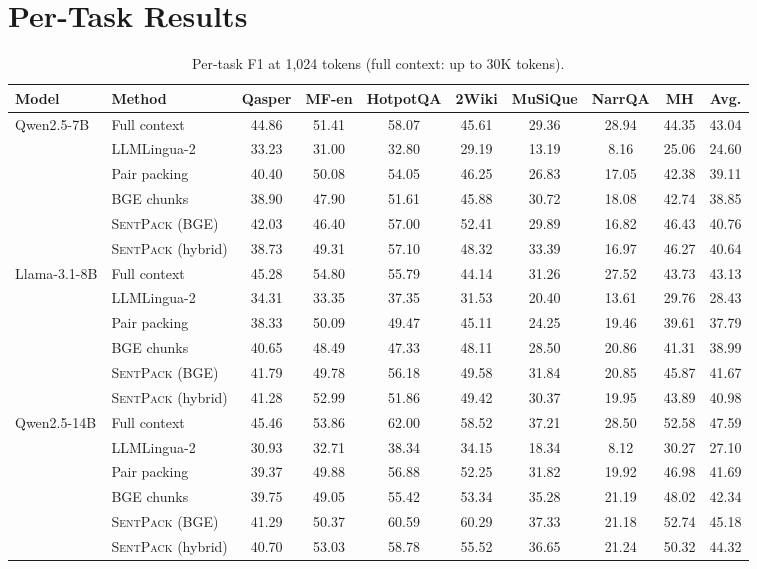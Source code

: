 \documentclass[11pt]{article}
\newcommand{\spk}{\textsc{SentPack}}
\begin{document}
\section{Per-Task Results}
\label{app:pertask}

\begin{table}[t]
\centering
\small
\setlength{\tabcolsep}{4pt}
\begin{tabular}{llcccccc|cc}
\toprule
Model & Method & Qasper & MF-en & HotpotQA & 2Wiki & MuSiQue & NarrQA & MH & Avg. \\
\midrule
\multirow{6}{*}{Qwen2.5-7B}
 & Full context & 44.86 & 51.41 & 58.07 & 45.61 & 29.36 & 28.94 & 44.35 & 43.04 \\
 & LLMLingua-2 & 33.23 & 31.00 & 32.80 & 29.19 & 13.19 & 8.16 & 25.06 & 24.60 \\
 & Pair packing & 40.40 & 50.08 & 54.05 & 46.25 & 26.83 & 17.05 & 42.38 & 39.11 \\
 & BGE chunks & 38.90 & 47.90 & 51.61 & 45.88 & 30.72 & 18.08 & 42.74 & 38.85 \\
 & \spk{} (BGE) & 42.03 & 46.40 & 57.00 & 52.41 & 29.89 & 16.82 & 46.43 & 40.76 \\
 & \spk{} (hybrid) & 38.73 & 49.31 & 57.10 & 48.32 & 33.39 & 16.97 & 46.27 & 40.64 \\
\midrule
\multirow{6}{*}{Llama-3.1-8B}
 & Full context & 45.28 & 54.80 & 55.79 & 44.14 & 31.26 & 27.52 & 43.73 & 43.13 \\
 & LLMLingua-2 & 34.31 & 33.35 & 37.35 & 31.53 & 20.40 & 13.61 & 29.76 & 28.43 \\
 & Pair packing & 38.33 & 50.09 & 49.47 & 45.11 & 24.25 & 19.46 & 39.61 & 37.79 \\
 & BGE chunks & 40.65 & 48.49 & 47.33 & 48.11 & 28.50 & 20.86 & 41.31 & 38.99 \\
 & \spk{} (BGE) & 41.79 & 49.78 & 56.18 & 49.58 & 31.84 & 20.85 & 45.87 & 41.67 \\
 & \spk{} (hybrid) & 41.28 & 52.99 & 51.86 & 49.42 & 30.37 & 19.95 & 43.89 & 40.98 \\
\midrule
\multirow{6}{*}{Qwen2.5-14B}
 & Full context & 45.46 & 53.86 & 62.00 & 58.52 & 37.21 & 28.50 & 52.58 & 47.59 \\
 & LLMLingua-2 & 30.93 & 32.71 & 38.34 & 34.15 & 18.34 & 8.12 & 30.27 & 27.10 \\
 & Pair packing & 39.37 & 49.88 & 56.88 & 52.25 & 31.82 & 19.92 & 46.98 & 41.69 \\
 & BGE chunks & 39.75 & 49.05 & 55.42 & 53.34 & 35.28 & 21.19 & 48.02 & 42.34 \\
 & \spk{} (BGE) & 41.29 & 50.37 & 60.59 & 60.29 & 37.33 & 21.18 & 52.74 & 45.18 \\
 & \spk{} (hybrid) & 40.70 & 53.03 & 58.78 & 55.52 & 36.65 & 21.24 & 50.32 & 44.32 \\
\bottomrule
\end{tabular}
\caption{Per-task F1 at 1,024 tokens (full context: up to 30K tokens).}
\label{tab:pertask}
\end{table}
\end{document}
